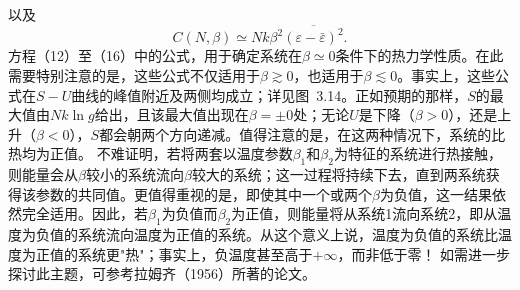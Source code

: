 以及
\begin{equation}\tag{3.5.116}\label{eq:3.5.116}
C ( N , \beta ) \simeq N k \beta ^{2} \overline { { ( \varepsilon - \bar { \varepsilon } ) ^{2} } } .
\end{equation}
方程（12）至（16）中的公式，用于确定系统在\(\beta \simeq 0\)条件下的热力学性质。在此需要特别注意的是，这些公式不仅适用于\(\beta \gtrsim 0\)，也适用于\(\beta \lesssim 0\)。事实上，这些公式在\(S-U\)曲线的峰值附近及两侧均成立；详见图~3.14。正如预期的那样，\(S\)的最大值由\(Nk\ln g\)给出，且该最大值出现在\(\beta = \pm 0\)处；无论\(U\)是下降（\(\beta > 0\)），还是上升（\(\beta < 0\)），\(S\)都会朝两个方向递减。值得注意的是，在这两种情况下，系统的比热均为正值。
不难证明，若将两套以温度参数\(\beta_{1}\)和\(\beta_{2}\)为特征的系统进行热接触，则能量会从\(\beta\)较小的系统流向\(\beta\)较大的系统；这一过程将持续下去，直到两系统获得该参数的共同值。更值得重视的是，即使其中一个或两个\(\beta\)为负值，这一结果依然完全适用。因此，若\(\beta_{1}\)为负值而\(\beta_{2}\)为正值，则能量将从系统1流向系统2，即从温度为负值的系统流向温度为正值的系统。从这个意义上说，温度为负值的系统比温度为正值的系统更"热"；事实上，负温度甚至高于\(+\infty\)，而非低于零！
如需进一步探讨此主题，可参考拉姆齐（1956）所著的论文。
